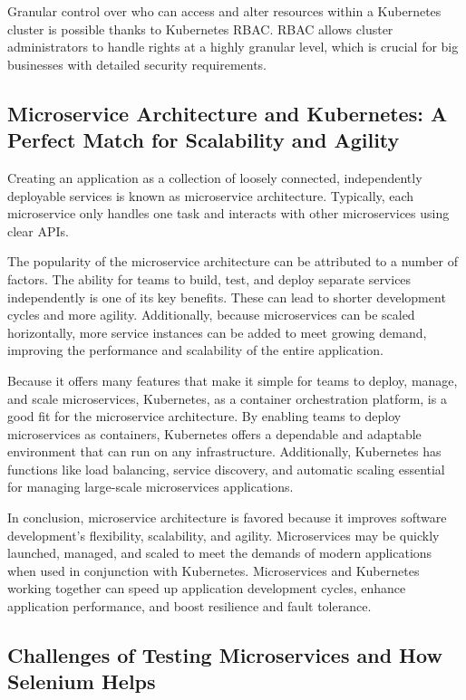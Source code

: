 Granular control over who can access and alter resources within a Kubernetes cluster is possible thanks to Kubernetes RBAC. RBAC allows cluster administrators to handle rights at a highly granular level, which is crucial for big businesses with detailed security requirements.


\subsection{Microservice Architecture and Kubernetes: A Perfect Match for Scalability and Agility}

Creating an application as a collection of loosely connected, independently deployable services is known as microservice architecture. Typically, each microservice only handles one task and interacts with other microservices using clear APIs.

The popularity of the microservice architecture can be attributed to a number of factors. The ability for teams to build, test, and deploy separate services independently is one of its key benefits. These can lead to shorter development cycles and more agility. Additionally, because microservices can be scaled horizontally, more service instances can be added to meet growing demand, improving the performance and scalability of the entire application.

Because it offers many features that make it simple for teams to deploy, manage, and scale microservices, Kubernetes, as a container orchestration platform, is a good fit for the microservice architecture. By enabling teams to deploy microservices as containers, Kubernetes offers a dependable and adaptable environment that can run on any infrastructure. Additionally, Kubernetes has functions like load balancing, service discovery, and automatic scaling essential for managing large-scale microservices applications.

In conclusion, microservice architecture is favored because it improves software development's flexibility, scalability, and agility. Microservices may be quickly launched, managed, and scaled to meet the demands of modern applications when used in conjunction with Kubernetes. Microservices and Kubernetes working together can speed up application development cycles, enhance application performance, and boost resilience and fault tolerance.


\subsection{Challenges of Testing Microservices and How Selenium Helps}

